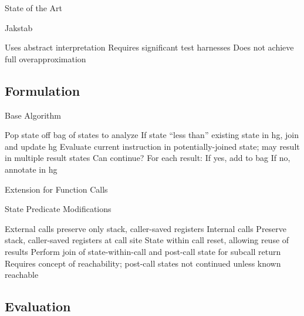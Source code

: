 \begin{frame}{State of the Art}
  \begin{block}{Jakstab}
    \begin{outline}
      \1 Uses \alert{abstract interpretation}
      \1 Requires significant \alert{test harnesses}
      \1 Does not achieve full \alert{overapproximation}
    \end{outline}
  \end{block}
\end{frame}


\subsection{Formulation}

\begin{frame}{Base Algorithm}
  \begin{outline}[enumerate]
    \1<+-> Pop state off \gls{bag} of states to analyze
    \1<+-> If state \alert{``less than''} existing state in \gls{hg}, join and update \gls{hg}
    \1<+-> Evaluate current instruction in potentially-joined state; may result in multiple result states
    \1<+-> Can continue? For each result:
      \2 If yes, add to bag
      \2 If no, annotate in \gls{hg}
  \end{outline}
\end{frame}

\begin{frame}{Extension for Function Calls}
  \begin{block}{State Predicate Modifications}
    \begin{outline}
      \1<+-> External calls preserve only stack, \alert{caller-saved} registers
      \1<+-> Internal calls
        \2 Preserve stack, \alert{caller-saved} registers at call site
        \2 State within call reset, allowing reuse of results
        \2 Perform join of state-within-call and post-call state for subcall return
      \1<+-> Requires concept of \alert{reachability}; post-call states not continued unless known reachable
    \end{outline}
  \end{block}
\end{frame}


\subsection{Evaluation}

